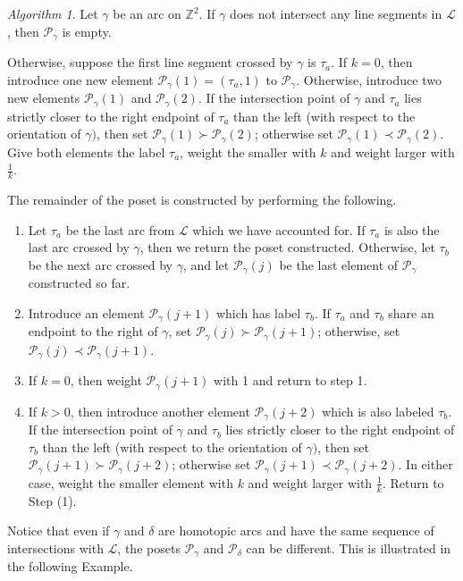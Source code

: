 \documentclass[12pt, letterpaper,table]{amsart}
\theoremstyle{remark}
\newtheorem{algorithm}[theorem]{Algorithm}
\newcommand{\calP}{\mathcal{P}}
\begin{document}
\begin{algorithm}\label{algo:Old}
Let $\gamma$ be an arc on $\mathbb{Z}^2$.  If $\gamma$ does not intersect any line segments in $\mathcal{L}$, then $\calP_\gamma$ is empty.

Otherwise, suppose the first line segment crossed by $\gamma$ is $\tau_a$. If $k = 0$, then introduce one new element $\calP_\gamma(1) = (\tau_a,1)$ to $\calP_\gamma$. Otherwise, introduce two new elements $\calP_\gamma(1)$ and $\calP_\gamma(2)$. If the intersection point of $\gamma$ and $\tau_a$ lies strictly closer to the right endpoint of $\tau_a$ than the left (with respect to the orientation of $\gamma)$, then set $\calP_\gamma(1) \succ \calP_\gamma(2)$; otherwise set $\calP_\gamma(1) \prec \calP_\gamma(2)$. Give both elements the label $\tau_a$, weight the smaller with $k$ and weight larger with $\frac{1}{k}$.

The remainder of the poset is constructed by performing the following.
\begin{enumerate}
    \item Let $\tau_a$ be the last arc from $\mathcal{L}$ which we have accounted for. If $\tau_a$ is also the last arc crossed by $\gamma$, then we return the poset constructed. Otherwise, let $\tau_b$ be the next arc crossed by $\gamma$, and let $\calP_\gamma(j)$ be the last element of $\calP_\gamma$ constructed so far.
    \item Introduce an element $\calP_\gamma(j+1)$ which has label $\tau_b$. If $\tau_a$ and $\tau_b$ share an endpoint to the right of $\gamma$, set $\calP_\gamma(j) \succ \calP_\gamma(j+1)$; otherwise,  set $\calP_\gamma(j) \prec \calP_\gamma(j+1)$.
    \item If $k = 0$, then weight $\calP_\gamma(j+1)$ with 1 and return to step 1. 
    \item If $k > 0$, then introduce another element $\calP_\gamma(j+2)$ which is also labeled $\tau_b$. If the intersection point of $\gamma$ and $\tau_b$ lies strictly closer to the right endpoint of $\tau_b$ than the left (with respect to the orientation of $\gamma)$, then set $\calP_\gamma(j+1) \succ \calP_\gamma(j+2)$; otherwise set $\calP_\gamma(j+1) \prec \calP_\gamma(j+2)$. In either case, weight the smaller element with $k$ and weight larger with $\frac{1}{k}$. Return to Step (1).
\end{enumerate}  
\end{algorithm}

Notice that even if $\gamma$ and $\delta$ are homotopic arcs and have the same sequence of intersections with $\mathcal{L}$, the posets $\calP_\gamma$ and $\calP_\delta$ can be different.  This is illustrated in the following Example.
\end{document}

